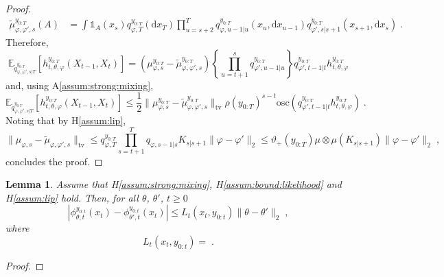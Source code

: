 \documentclass{article}
\newtheorem{lemma}[theorem]{Lemma}
\newcommand{\udupvar}{\vartheta_+}
\newcommand{\1}{\mathbbm{1}}
\newcommand{\rmd}{\ensuremath{\mathrm{d}}}
\newcommand{\eqsp}{\;}
\begin{document}
\begin{proof}
\begin{align*}
\tilde\mu^{y_{0:T}}_{\varphi,\varphi',s}(A) &= \int \mathds{1}_A(x_s) q^{y_{0:T}}_{\varphi,T}(\rmd x_T)\prod_{u=s+2}^Tq^{y_{0:T}}_{\varphi,u-1|u}(x_u,\rmd x_{u-1})q^{y_{0:T}}_{\varphi',s|s+1}(x_{s+1},\rmd x_{s})\eqsp.
\end{align*}
Therefore,
$$
\mathbb{E}_{\tilde q^{y_{0:T}}_{\varphi,\varphi',s|T}}\left[h^{y_{0:T}}_{t,\theta,\varphi}(X_{t-1},X_t)\right] = \left(\mu^{y_{0:T}}_{\varphi,s} - \tilde\mu^{y_{0:T}}_{\varphi,\varphi',s}\right)\left\{\prod_{u=t+1}^{s}q^{y_{0:T}}_{\varphi',u-1|u}\right\}q^{y_{0:T}}_{\varphi',t-1|t}h^{y_{0:T}}_{t,\theta,\varphi}
$$
and, using A\ref{assum:strong:mixing},
$$
\mathbb{E}_{\tilde q^{y_{0:T}}_{\varphi,\varphi',s|T}}\left[h^{y_{0:T}}_{t,\theta,\varphi}(X_{t-1},X_t)\right]  \leq \frac{1}{2}\|\mu^{y_{0:T}}_{\varphi,s}-\tilde\mu^{y_{0:T}}_{\varphi,\varphi',s}\|_{\mathrm{tv}}\rho(y_{0:T})^{s-t}\mathrm{osc}\left(q^{y_{0:T}}_{\varphi',t-1|t}h^{y_{0:T}}_{t,\theta,\varphi}\right)\eqsp.
$$
Noting that by H\ref{assum:lip},
$$
\|\mu_{\varphi,s}-\tilde\mu_{\varphi,\varphi',s}\|_{\mathrm{tv}} \leq q^{y_{0:T}}_{\varphi,T}\prod_{s=t+1}^Tq_{\varphi,s-1|s}K_{s|s+1}\|\varphi-\varphi'\|_2\leq \udupvar(y_{0:T})\mu\otimes\mu (K_{s|s+1})\|\varphi-\varphi'\|_2\eqsp,
$$
concludes the proof.
\end{proof}

\begin{lemma}
Assume that H\ref{assum:strong:mixing}, H\ref{assum:bound:likelihood} and H\ref{assum:lip} hold. Then, for all $\theta$, $\theta'$, $t\geq 0$
$$
\left|\phi_{\theta,t}^{y_{0:t}}(x_{t}) - \phi_{\theta',t}^{y_{0:t}}(x_{t})\right| \leq  L_t(x_t,y_{0:t})\|\theta-\theta'\|_2\eqsp,
$$
where
$$
L_t(x_t,y_{0:t}) = \eqsp.
$$
\end{lemma}
\begin{proof}

\end{proof}
\end{document}
